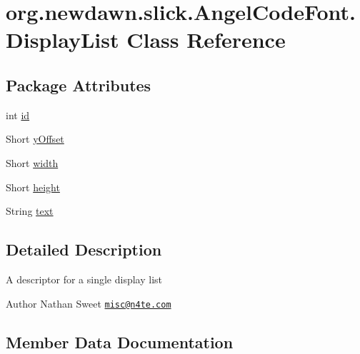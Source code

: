 \hypertarget{classorg_1_1newdawn_1_1slick_1_1_angel_code_font_1_1_display_list}{}\section{org.\+newdawn.\+slick.\+Angel\+Code\+Font.\+Display\+List Class Reference}
\label{classorg_1_1newdawn_1_1slick_1_1_angel_code_font_1_1_display_list}
\subsection*{Package Attributes}
\begin{DoxyCompactItemize}
\item 
int \mbox{\hyperlink{classorg_1_1newdawn_1_1slick_1_1_angel_code_font_1_1_display_list_a2a19c792a8181979c428fe07f780b137}{id}}
\item 
Short \mbox{\hyperlink{classorg_1_1newdawn_1_1slick_1_1_angel_code_font_1_1_display_list_abdc0010d9f43edd74614218ba20b8761}{y\+Offset}}
\item 
Short \mbox{\hyperlink{classorg_1_1newdawn_1_1slick_1_1_angel_code_font_1_1_display_list_a7b5da4ad052a0516c94c57d367ded5b0}{width}}
\item 
Short \mbox{\hyperlink{classorg_1_1newdawn_1_1slick_1_1_angel_code_font_1_1_display_list_a1aadc67f83aeb208b8b00b811e3881aa}{height}}
\item 
String \mbox{\hyperlink{classorg_1_1newdawn_1_1slick_1_1_angel_code_font_1_1_display_list_a046ed65c52185321ea0de11ed51154d8}{text}}
\end{DoxyCompactItemize}


\subsection{Detailed Description}
A descriptor for a single display list

\begin{DoxyAuthor}{Author}
Nathan Sweet \href{mailto:misc@n4te.com}{\tt misc@n4te.\+com} 
\end{DoxyAuthor}


\subsection{Member Data Documentation}
\mbox{\label{classorg_1_1newdawn_1_1slick_1_1_angel_code_font_1_1_display_list_a1aadc67f83aeb208b8b00b811e3881aa}} 

